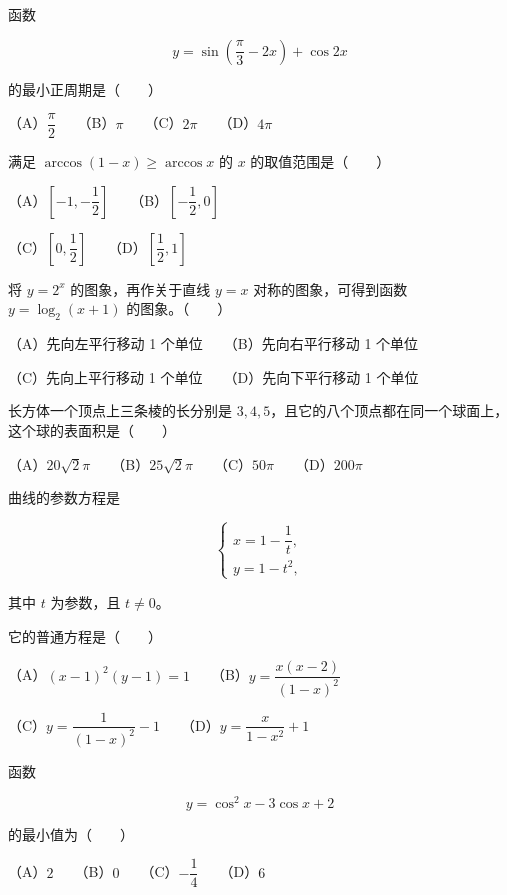 \begin{question}
函数

\nopagebreak[4]
\[
y=\sin\left(\dfrac\pi3-2x\right)+\cos2x
\]

的最小正周期是\mbox{（　　）}

（A）$\dfrac\pi2$　　（B）$\pi$　　（C）$2\pi$　　（D）$4\pi$

\end{question}
\begin{question}
满足 $\arccos(1-x)\geqslant\arccos x$ 的 $x$ 的取值范围是\mbox{（　　）}

（A）$\left[-1,-\dfrac12\right]$　　（B）$\left[-\dfrac12,0\right]$

（C）$\left[0,\dfrac12\right]$　　（D）$\left[\dfrac12,1\right]$

\end{question}
\begin{question}
将 $y=2^x$ 的图象\gkblank{}，再作关于直线 $y=x$ 对称的图象，可得到函数 $y=\log_2(x+1)$ 的图象。\mbox{（　　）}

（A）先向左平行移动 1 个单位　　（B）先向右平行移动 1 个单位

（C）先向上平行移动 1 个单位　　（D）先向下平行移动 1 个单位

\end{question}
\begin{question}
长方体一个顶点上三条棱的长分别是 $3,4,5$，且它的八个顶点都在同一个球面上，这个球的表面积是\mbox{（　　）}

（A）$20\sqrt2\pi$　　（B）$25\sqrt2\pi$　　（C）$50\pi$　　（D）$200\pi$

\end{question}
\begin{question}
曲线的参数方程是

\nopagebreak[4]
\[
\begin{cases}
x=1-\dfrac1t,\\
y=1-t^2,
\end{cases}
\]

其中 $t$ 为参数，且 $t\neq0$。

它的普通方程是\mbox{（　　）}

（A）$(x-1)^2(y-1)=1$　　（B）$y=\dfrac{x(x-2)}{(1-x)^2}$

（C）$y=\dfrac1{(1-x)^2}-1$　　（D）$y=\dfrac{x}{1-x^2}+1$

\end{question}
\begin{question}
函数

\nopagebreak[4]
\[
y=\cos^2x-3\cos x+2
\]

的最小值为\mbox{（　　）}

（A）$2$　　（B）$0$　　（C）$-\dfrac14$　　（D）$6$

\end{question}
